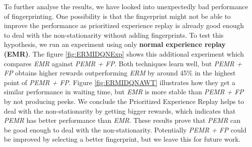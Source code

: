 \documentclass{llncs}
\begin{document}
To further analyse the results, we have looked into unexpectedly bad performance of fingerprinting. One possibility is that the fingerprint might not be able to improve the performance as prioritized experience replay is already good enough to deal with the non-stationarity without adding fingerprints. To test this hypothesis, we run an experiment using only \textbf{normal experience replay (EMR)}. The figure \ref{fig:ERMIDQNExp} shows this additional experiment which compares \textit{EMR} against \textit{PEMR + FP}. Both techniques learn well, but \textit{PEMR + FP} obtains higher rewards outperforming \textit{ERM} by around 45$\%$ in the highest point of \textit{PEMR + FP}. Figure \ref{fig:ERMIDQNAWT} illustrates how they get a similar performance in waiting time, but \textit{EMR} is more stable than \textit{PEMR + FP} by not producing peeks. We conclude the Prioritized Experience Replay helps to deal with the non-stationarity by getting bigger rewards, which indicates that \textit{PEMR} has better performance than \textit{EMR}. These results prove that \textit{PEMR} can be good enough to deal with the non-stationarity. Potentially \textit{PEMR + FP} could be improved by selecting a better fingerprint, but we leave this for future work.
\end{document}
